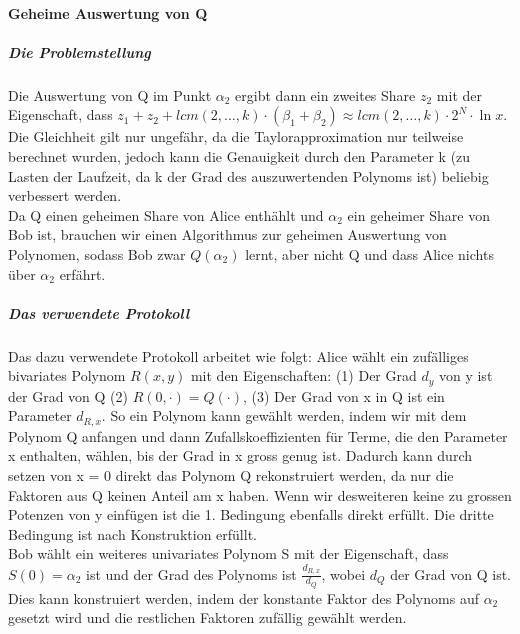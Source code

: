 \documentclass{article}
\begin{document}
\paragraph{Geheime Auswertung von Q}
\subparagraph{Die Problemstellung}
Die Auswertung von Q im Punkt \(\alpha_2\) ergibt dann ein zweites Share 
\(z_2\) mit der Eigenschaft, dass 
\(z_1 + z_2 + lcm(2,\dots,k)\cdot(\beta_1+\beta_2) \approx 
lcm(2,\dots,k)\cdot 2^N \cdot \ln x\). Die Gleichheit gilt nur ungef\"ahr,
da die Taylorapproximation nur teilweise berechnet wurden, jedoch kann
die Genauigkeit durch den Parameter k (zu Lasten der Laufzeit, da k der Grad
des auszuwertenden Polynoms ist)  beliebig verbessert werden.\\
Da Q einen geheimen Share von Alice enth\"ahlt und \(\alpha_2\) ein
geheimer Share von Bob ist, brauchen wir einen Algorithmus zur
geheimen Auswertung von Polynomen, sodass Bob zwar \(Q(\alpha_2)\) lernt, 
aber nicht Q und dass Alice nichts \"uber \(\alpha_2\) erf\"ahrt.
\subparagraph{Das verwendete Protokoll}
Das dazu verwendete Protokoll arbeitet wie folgt:
Alice w\"ahlt ein zuf\"alliges bivariates Polynom \(R(x, y)\) mit den 
Eigenschaften:  
 (1) Der Grad \(d_y\) von y ist der Grad von Q
 (2) \(R(0,\cdot) = Q(\cdot)\),
 (3) Der Grad von x in Q ist ein Parameter \(d_{R,x}\).
So ein Polynom kann gew\"ahlt werden, indem wir mit dem Polynom Q
anfangen und dann Zufallskoeffizienten f\"ur Terme, die den Parameter
x enthalten, w\"ahlen, bis der Grad in x gross genug ist. Dadurch
kann durch setzen von x = 0 direkt das Polynom Q rekonstruiert werden,
da nur die Faktoren aus Q keinen Anteil am x haben. Wenn wir desweiteren
keine zu grossen Potenzen von y einf\"ugen ist die 1. Bedingung ebenfalls
direkt erf\"ullt.  Die dritte Bedingung ist nach Konstruktion erf\"ullt.\\
Bob w\"ahlt ein weiteres univariates Polynom S mit der Eigenschaft, dass
\(S(0) = \alpha_2\) ist und der Grad des Polynoms ist \(\frac{d_{R,x}}{d_Q}\),
wobei \(d_Q\) der Grad von Q ist. Dies kann konstruiert werden, indem 
der konstante Faktor des Polynoms auf \(\alpha_2\) gesetzt wird und
die restlichen Faktoren zuf\"allig gew\"ahlt werden.
\end{document}
